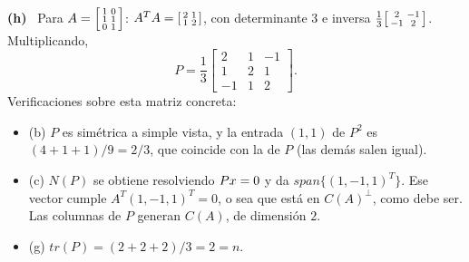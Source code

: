 \documentclass[11pt,a4paper]{article}
\newcommand{\bi}[1]{\boldsymbol{#1}}
\newcommand{\n}[1]{\boldsymbol{#1}}
\DeclareMathOperator{\gen}{span}
\DeclareMathOperator{\tr}{tr}
\DeclareMathOperator{\rg}{rg}
\def\n#1{#1}\def\bi#1{#1}\def\rg{rg}\def\tr{tr}\def\gen{span}%
\newcommand{\itemsol}[1]{\par\medskip\noindent\textbf{(#1)}\ \ignorespaces}
\begin{document}
\itemsol{h} Para $A=\begin{bsmallmatrix}1&0\\1&1\\0&1\end{bsmallmatrix}$:
$A^TA=\begin{bsmallmatrix}2&1\\1&2\end{bsmallmatrix}$, con determinante $3$ e
inversa $\tfrac13\begin{bsmallmatrix}2&-1\\-1&2\end{bsmallmatrix}$. Multiplicando,
\[
P=\frac13\begin{bmatrix}2&1&-1\\ 1&2&1\\ -1&1&2\end{bmatrix}.
\]
Verificaciones sobre esta matriz concreta:
\begin{itemize}[itemsep=2pt,topsep=3pt]
\item (b) $P$ es simétrica a simple vista, y la entrada $(1,1)$ de $P^2$ es
$(4+1+1)/9=2/3$, que coincide con la de $P$ (las demás salen igual).
\item (c) $N(P)$ se obtiene resolviendo $P\bx=\n0$ y da $\gen\{(1,-1,1)^T\}$.
Ese vector cumple $A^T(1,-1,1)^T=\n0$, o sea que está en $C(A)^{\perp}$, como
debe ser. Las columnas de $P$ generan $C(A)$, de dimensión $2$.
\item (g) $\tr(P)=(2+2+2)/3=2=n$.
\end{itemize}
\end{document}
